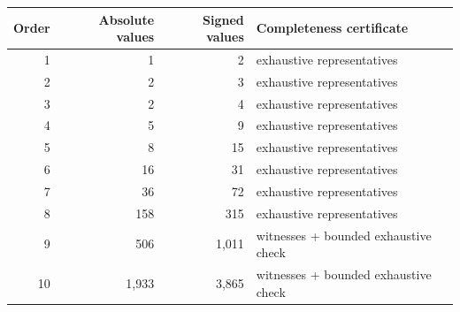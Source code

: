 \begin{tabular}{rrrl}
\toprule
Order & Absolute values & Signed values & Completeness certificate\\
\midrule
1 & 1 & 2 & exhaustive representatives \\
2 & 2 & 3 & exhaustive representatives \\
3 & 2 & 4 & exhaustive representatives \\
4 & 5 & 9 & exhaustive representatives \\
5 & 8 & 15 & exhaustive representatives \\
6 & 16 & 31 & exhaustive representatives \\
7 & 36 & 72 & exhaustive representatives \\
8 & 158 & 315 & exhaustive representatives \\
9 & 506 & 1,011 & witnesses + bounded exhaustive check \\
10 & 1,933 & 3,865 & witnesses + bounded exhaustive check \\
\bottomrule
\end{tabular}
